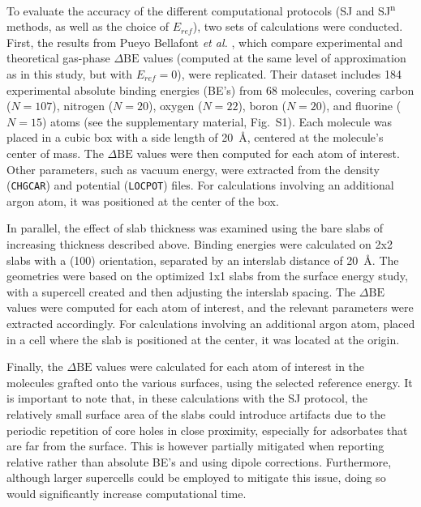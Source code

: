 \documentclass[journal=jpccck,manuscript=article]{achemso}
\def\dbe{\ensuremath{\Delta\text{BE}}}
\begin{document}
To evaluate the accuracy of the different computational protocols (SJ and SJ\textsuperscript{n} methods, as well as the choice of $E_{ref}$), two sets of calculations were conducted. First, the results from Pueyo Bellafont \textit{et al.} \cite{pueyobellafontPredictingCoreLevel2017}, which compare experimental and theoretical gas-phase \dbe{} values (computed at the same level of approximation as in this study, but with $E_{ref}=0$), were replicated. Their dataset includes 184 experimental absolute binding energies (BE's) from 68 molecules, covering carbon ($N=107$), nitrogen ($N=20$), oxygen ($N=22$), boron ($N=20$), and fluorine ($N=15$) atoms (see the supplementary material, Fig.~S1). Each molecule was placed in a cubic box with a side length of \SI{20}{\angstrom}, centered at the molecule's center of mass. The \dbe{} values were then computed for each atom of interest. Other parameters, such as vacuum energy, were extracted from the density (\texttt{CHGCAR}) and potential (\texttt{LOCPOT}) files. For calculations involving an additional argon atom, it was positioned at the center of the box.

In parallel, the effect of slab thickness was examined using the bare slabs of increasing thickness described above. Binding energies were calculated on 2x2 slabs with a (100) orientation, separated by an interslab distance of \SI{20}{\angstrom}. The geometries were based on the optimized 1x1 slabs from the surface energy study, with a supercell created and then adjusting the interslab spacing. The \dbe{} values were computed for each atom of interest, and the relevant parameters were extracted accordingly. For calculations involving an additional argon atom, placed in a cell where the slab is positioned at the center, it was located at the origin.

Finally, the \dbe{} values were calculated for each atom of interest in the molecules grafted onto the various surfaces, using the selected reference energy. It is important to note that, in these calculations with the SJ protocol, the relatively small surface area of the slabs could introduce artifacts due to the periodic repetition of core holes in close proximity, especially for adsorbates that are far from the surface.\cite{taucherFinalStateSimulationsCoreLevel2020} This is however partially mitigated when reporting relative rather than absolute BE's and using dipole corrections. Furthermore, although larger supercells could be employed to mitigate this issue, doing so would significantly increase computational time.
\end{document}
